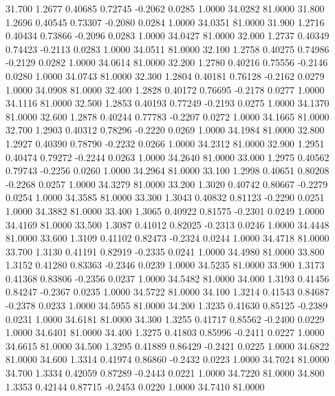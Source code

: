   31.700   1.2677   0.40685   0.72745  -0.2062   0.0285   1.0000  34.0282  81.0000
  31.800   1.2696   0.40545   0.73307  -0.2080   0.0284   1.0000  34.0351  81.0000
  31.900   1.2716   0.40434   0.73866  -0.2096   0.0283   1.0000  34.0427  81.0000
  32.000   1.2737   0.40349   0.74423  -0.2113   0.0283   1.0000  34.0511  81.0000
  32.100   1.2758   0.40275   0.74986  -0.2129   0.0282   1.0000  34.0614  81.0000
  32.200   1.2780   0.40216   0.75556  -0.2146   0.0280   1.0000  34.0743  81.0000
  32.300   1.2804   0.40181   0.76128  -0.2162   0.0279   1.0000  34.0908  81.0000
  32.400   1.2828   0.40172   0.76695  -0.2178   0.0277   1.0000  34.1116  81.0000
  32.500   1.2853   0.40193   0.77249  -0.2193   0.0275   1.0000  34.1370  81.0000
  32.600   1.2878   0.40244   0.77783  -0.2207   0.0272   1.0000  34.1665  81.0000
  32.700   1.2903   0.40312   0.78296  -0.2220   0.0269   1.0000  34.1984  81.0000
  32.800   1.2927   0.40390   0.78790  -0.2232   0.0266   1.0000  34.2312  81.0000
  32.900   1.2951   0.40474   0.79272  -0.2244   0.0263   1.0000  34.2640  81.0000
  33.000   1.2975   0.40562   0.79743  -0.2256   0.0260   1.0000  34.2964  81.0000
  33.100   1.2998   0.40651   0.80208  -0.2268   0.0257   1.0000  34.3279  81.0000
  33.200   1.3020   0.40742   0.80667  -0.2279   0.0254   1.0000  34.3585  81.0000
  33.300   1.3043   0.40832   0.81123  -0.2290   0.0251   1.0000  34.3882  81.0000
  33.400   1.3065   0.40922   0.81575  -0.2301   0.0249   1.0000  34.4169  81.0000
  33.500   1.3087   0.41012   0.82025  -0.2313   0.0246   1.0000  34.4448  81.0000
  33.600   1.3109   0.41102   0.82473  -0.2324   0.0244   1.0000  34.4718  81.0000
  33.700   1.3130   0.41191   0.82919  -0.2335   0.0241   1.0000  34.4980  81.0000
  33.800   1.3152   0.41280   0.83363  -0.2346   0.0239   1.0000  34.5235  81.0000
  33.900   1.3173   0.41368   0.83806  -0.2356   0.0237   1.0000  34.5482  81.0000
  34.000   1.3193   0.41456   0.84247  -0.2367   0.0235   1.0000  34.5722  81.0000
  34.100   1.3214   0.41543   0.84687  -0.2378   0.0233   1.0000  34.5955  81.0000
  34.200   1.3235   0.41630   0.85125  -0.2389   0.0231   1.0000  34.6181  81.0000
  34.300   1.3255   0.41717   0.85562  -0.2400   0.0229   1.0000  34.6401  81.0000
  34.400   1.3275   0.41803   0.85996  -0.2411   0.0227   1.0000  34.6615  81.0000
  34.500   1.3295   0.41889   0.86429  -0.2421   0.0225   1.0000  34.6822  81.0000
  34.600   1.3314   0.41974   0.86860  -0.2432   0.0223   1.0000  34.7024  81.0000
  34.700   1.3334   0.42059   0.87289  -0.2443   0.0221   1.0000  34.7220  81.0000
  34.800   1.3353   0.42144   0.87715  -0.2453   0.0220   1.0000  34.7410  81.0000
